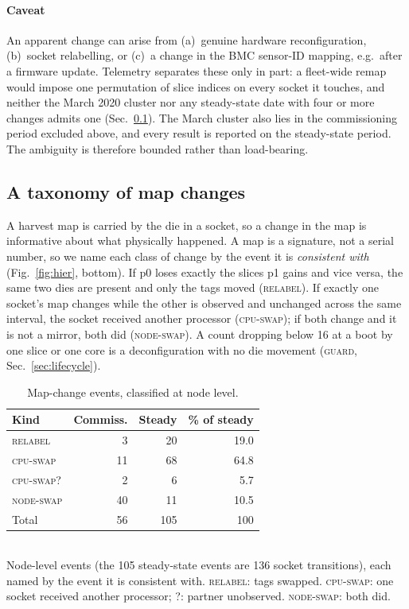 \documentclass[10pt,conference]{IEEEtran}
\begin{document}
\paragraph*{Caveat} An apparent change can arise from (a)~genuine hardware reconfiguration,
(b)~socket relabelling, or (c)~a change in the BMC sensor-ID mapping, e.g.\ after a firmware
update. Telemetry separates these only in part: a fleet-wide remap would impose one permutation of
slice indices on every socket it touches, and neither the March 2020 cluster nor any steady-state
date with four or more changes admits one (Sec.~\ref{sec:taxonomy}). The March cluster also lies
in the commissioning period excluded above, and every result is reported on the steady-state
period. The ambiguity is therefore bounded rather than load-bearing.


\subsection{A taxonomy of map changes}
\label{sec:taxonomy}
A harvest map is carried by the die in a socket, so a change in the map is informative about what
physically happened. A map is a signature, not a serial number, so we name each class of change by
the event it is \emph{consistent with} (Fig.~\ref{fig:hier}, bottom). If p0 loses exactly the slices
p1 gains and vice versa, the same two dies are present and only the tags moved (\textsc{relabel}).
If exactly one socket's map changes while the other is observed and unchanged across the same
interval, the socket received another processor (\textsc{cpu-swap}); if both change and it is not a
mirror, both did (\textsc{node-swap}). A count dropping below 16 at a boot by one slice or one core
is a deconfiguration with no die movement (\textsc{guard}, Sec.~\ref{sec:lifecycle}).

\begin{table}[h]\centering\caption{Map-change events, classified at node level.}
\label{tab:taxonomy}
\begin{tabular}{lrrr}\toprule
Kind & Commiss. & Steady & \% of steady\\\midrule
\textsc{relabel}   &  3 &  20 & 19.0\\
\textsc{cpu-swap}  & 11 &  68 & 64.8\\
\textsc{cpu-swap?} &  2 &   6 &  5.7\\
\textsc{node-swap} & 40 &  11 & 10.5\\\midrule
Total              & 56 & 105 & 100\\
\bottomrule\end{tabular}
\\[2pt]\footnotesize Node-level events (the 105 steady-state events are 136 socket transitions),
each named by the event it is consistent with. \textsc{relabel}: tags swapped. \textsc{cpu-swap}:
one socket received another processor; \textsc{?}: partner unobserved. \textsc{node-swap}: both did.
\end{table}
\end{document}
